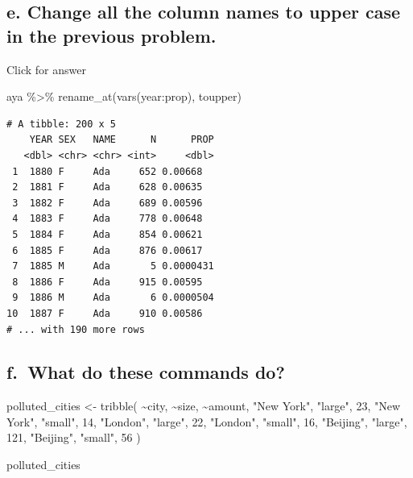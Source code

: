 \documentclass[
]{book}
\newenvironment{Shaded}{\begin{snugshade}}{\end{snugshade}}
\newcommand{\DecValTok}[1]{\textcolor[rgb]{0.00,0.00,0.81}{#1}}
\newcommand{\FunctionTok}[1]{\textcolor[rgb]{0.00,0.00,0.00}{#1}}
\newcommand{\NormalTok}[1]{#1}
\newcommand{\OtherTok}[1]{\textcolor[rgb]{0.56,0.35,0.01}{#1}}
\newcommand{\SpecialCharTok}[1]{\textcolor[rgb]{0.00,0.00,0.00}{#1}}
\newcommand{\StringTok}[1]{\textcolor[rgb]{0.31,0.60,0.02}{#1}}
\begin{document}
\hypertarget{e.-change-all-the-column-names-to-upper-case-in-the-previous-problem.}{%
\subsection{e. Change all the column names to upper case in the previous problem.}\label{e.-change-all-the-column-names-to-upper-case-in-the-previous-problem.}}

Click for answer

\begin{Shaded}
\begin{Highlighting}[]
\NormalTok{aya }\SpecialCharTok{\%\textgreater{}\%} \FunctionTok{rename\_at}\NormalTok{(}\FunctionTok{vars}\NormalTok{(year}\SpecialCharTok{:}\NormalTok{prop), toupper)}
\end{Highlighting}
\end{Shaded}

\begin{verbatim}
# A tibble: 200 x 5
    YEAR SEX   NAME      N      PROP
   <dbl> <chr> <chr> <int>     <dbl>
 1  1880 F     Ada     652 0.00668  
 2  1881 F     Ada     628 0.00635  
 3  1882 F     Ada     689 0.00596  
 4  1883 F     Ada     778 0.00648  
 5  1884 F     Ada     854 0.00621  
 6  1885 F     Ada     876 0.00617  
 7  1885 M     Ada       5 0.0000431
 8  1886 F     Ada     915 0.00595  
 9  1886 M     Ada       6 0.0000504
10  1887 F     Ada     910 0.00586  
# ... with 190 more rows
\end{verbatim}

\hypertarget{f.-what-do-these-commands-do}{%
\subsection{f.~What do these commands do?}\label{f.-what-do-these-commands-do}}

\begin{Shaded}
\begin{Highlighting}[]
\NormalTok{polluted\_cities }\OtherTok{\textless{}{-}} \FunctionTok{tribble}\NormalTok{(}
       \SpecialCharTok{\textasciitilde{}}\NormalTok{city,   }\SpecialCharTok{\textasciitilde{}}\NormalTok{size, }\SpecialCharTok{\textasciitilde{}}\NormalTok{amount, }
  \StringTok{"New York"}\NormalTok{, }\StringTok{"large"}\NormalTok{,      }\DecValTok{23}\NormalTok{,}
  \StringTok{"New York"}\NormalTok{, }\StringTok{"small"}\NormalTok{,      }\DecValTok{14}\NormalTok{,}
    \StringTok{"London"}\NormalTok{, }\StringTok{"large"}\NormalTok{,      }\DecValTok{22}\NormalTok{,}
    \StringTok{"London"}\NormalTok{, }\StringTok{"small"}\NormalTok{,      }\DecValTok{16}\NormalTok{,}
   \StringTok{"Beijing"}\NormalTok{, }\StringTok{"large"}\NormalTok{,      }\DecValTok{121}\NormalTok{,}
   \StringTok{"Beijing"}\NormalTok{, }\StringTok{"small"}\NormalTok{,      }\DecValTok{56}
\NormalTok{)}

\NormalTok{polluted\_cities}
\end{Highlighting}
\end{Shaded}
\end{document}
